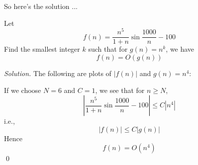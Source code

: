So here's the solution ...

\newpage

\begin{eg}
Let 
\[ 
f(n) = \frac{n^5}{1 + n} \sin \frac{1000}{n} - 100
\]
Find the smallest integer $k$ such that for $g(n) = n^k$, we have
\[
f(n) = O(g(n))
\]
\end{eg}

\textit{Solution.}
The following are plots of $|f(n)|$ and $g(n) = n^4$:


If we choose $N = 6$ and $C = 1$,
we see that for $n \geq N$,
\[
\left|
\frac{n^5}{1 + n} \sin \frac{1000}{n} - 100
\right| 
\leq C
\left|
n^4
\right|
\]
i.e.,
\[
|f(n)| \leq C|g(n)|
\]
Hence
\[
f(n) = O(n^4)
\]
\qed

\newpage
\newpage
\newpage
\newpage
\newpage
\newpage
\newpage
\newpage
\newpage
